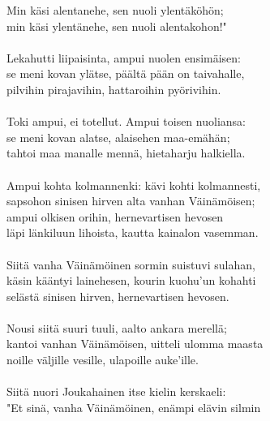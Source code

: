 Min käsi alentanehe, sen nuoli ylentäköhön;                 \\
min käsi ylentänehe, sen nuoli alentakohon!"                \\
                                                            \\
Lekahutti liipaisinta, ampui nuolen ensimäisen:             \\
se meni kovan ylätse, päältä pään on taivahalle,            \\
pilvihin pirajavihin, hattaroihin pyörivihin.               \\
                                                            \\
Toki ampui, ei totellut. Ampui toisen nuoliansa:            \\
se meni kovan alatse, alaisehen maa-emähän;                 \\
tahtoi maa manalle mennä, hietaharju halkiella.             \\
                                                            \\
Ampui kohta kolmannenki: kävi kohti kolmannesti,            \\
sapsohon sinisen hirven alta vanhan Väinämöisen;            \\
ampui olkisen orihin, hernevartisen hevosen                 \\
läpi länkiluun lihoista, kautta kainalon vasemman.          \\
                                                            \\
Siitä vanha Väinämöinen sormin suistuvi sulahan,            \\
käsin kääntyi lainehesen, kourin kuohu'un kohahti           \\
selästä sinisen hirven, hernevartisen hevosen.              \\
                                                            \\
Nousi siitä suuri tuuli, aalto ankara merellä;              \\
kantoi vanhan Väinämöisen, uitteli ulomma maasta            \\
noille väljille vesille, ulapoille auke'ille.               \\
                                                            \\
Siitä nuori Joukahainen itse kielin kerskaeli:              \\
"Et sinä, vanha Väinämöinen, enämpi elävin silmin           \\
